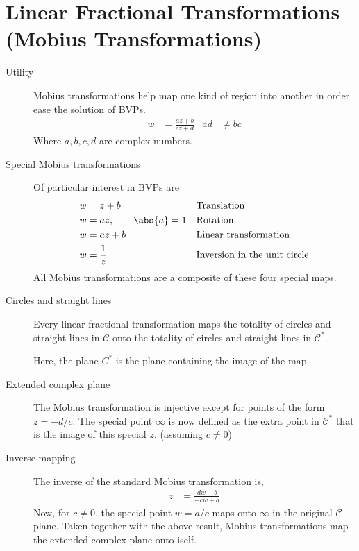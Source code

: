 \section{Linear Fractional Transformations (Mobius Transformations)}

\begin{description}
    \item[Utility] Mobius transformations help map one kind of region into another in
        order ease the solution of BVPs.
        \begin{align}
            w & = \frac{az + b}{cz + d} & ad & \neq bc
        \end{align}
        Where $ a,b,c,d $ are complex numbers.

    \item[Special Mobius transformations] Of particular interest in BVPs are
        \begin{align}
            w & = z + b                  &  & \text{Translation}                  \\
            w & = az, \qquad \abs{a} = 1 &  & \text{Rotation}                     \\
            w & = az + b                 &  & \text{Linear transformation}        \\
            w & = \frac{1}{z}            &  & \text{Inversion in the unit circle}
        \end{align}
        All Mobius transformations are a composite of these four special maps.

    \item[Circles and straight lines] Every linear fractional transformation maps the
        totality of circles and straight lines in $ \mathcal{C} $ onto the totality of
        circles and straight lines in $ \mathcal{C^*} $. \par
        Here, the plane $ C^* $ is the plane containing the image of the map.

    \item[Extended complex plane] The Mobius transformation is injective except for
        points of the form $ z = -d/c $. The special point $ \infty $ is now defined as
        the extra point in $ \mathcal{C^*} $ that is the image of this special $ z $.
        (assuming $ c \neq 0 $)

    \item[Inverse mapping] The inverse of the standard Mobius transformation is,
        \begin{align}
            z & = \frac{dw - b}{-cw + a}
        \end{align}
        Now, for $ c \neq 0 $, the special point $ w = a/c $ maps onto $ \infty $ in the
        original $ \mathcal{C} $ plane. Taken together with the above result,
        Mobius transformations map the extended complex plane onto iself.


\end{description}
